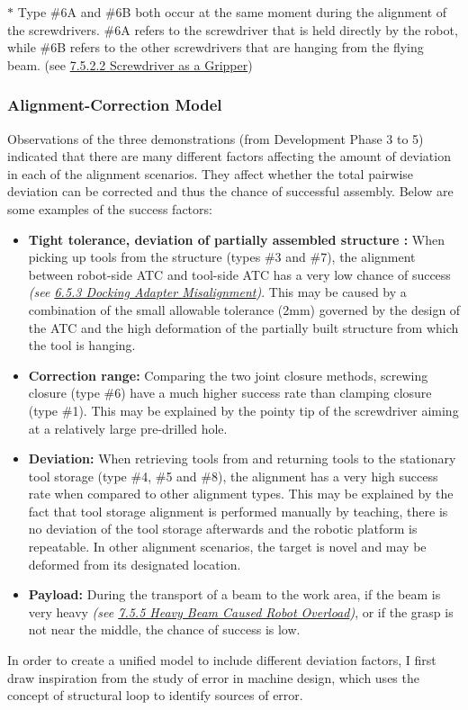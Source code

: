 \documentclass[11pt]{book}
\begin{document}
{\footnotesize $\ast$ Type $\#$6A and $\#$6B both occur at the same moment during the alignment of the screwdrivers. $\#$6A refers to the screwdriver that is held directly by the robot, while $\#$6B refers to the other screwdrivers that are hanging from the flying beam. (see \uline{7.5.2.2 Screwdriver as a Gripper})\par}

\subsubsection{Alignment-Correction Model}

Observations of the three demonstrations (from Development Phase 3 to 5) indicated that there are many different factors affecting the amount of deviation in each of the alignment scenarios. They affect whether the total pairwise deviation can be corrected and thus the chance of successful assembly. Below are some examples of the success factors:

\begin{itemize}
	\item \textbf{Tight tolerance, deviation of partially assembled structure :} When picking up tools from the structure (types $\#$3 and $\#$7), the alignment between robot-side ATC and tool-side ATC has a very low chance of success\textit{ (see \uline{6.5.3 Docking Adapter Misalignment})}. This may be caused by a combination of the small allowable tolerance (2mm) governed by the design of the ATC and the high deformation of the partially built structure from which the tool is hanging. 

	\item \textbf{Correction range: }Comparing the two joint closure methods, screwing closure (type $\#$6) have a much higher success rate than clamping closure (type $\#$1). This may be explained by the pointy tip of the screwdriver aiming at a relatively large pre-drilled hole.

	\item \textbf{Deviation:} When retrieving tools from and returning tools to the stationary tool storage (type $\#$4, $\#$5 and $\#$8), the alignment has a very high success rate when compared to other alignment types. This may be explained by the fact that tool storage alignment is performed manually by teaching, there is no deviation of the tool storage afterwards and the robotic platform is repeatable. In other alignment scenarios, the target is novel and may be deformed from its designated location.

	\item \textbf{Payload: }During the transport of a beam to the work area, if the beam is very heavy \textit{(see \uline{7.5.5 Heavy Beam Caused Robot Overload})}, or if the grasp is not near the middle, the chance of success is low. 

\end{itemize}
In order to create a unified model to include different deviation factors, I first draw inspiration from the study of error in machine design, which uses the concept of structural loop to identify sources of error.
\end{document}
